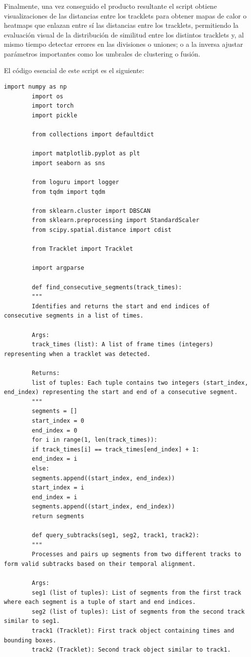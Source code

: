 \documentclass[12pt, a4paper, twoside]{article}
\begin{document}
	Finalmente, una vez conseguido el producto resultante el script obtiene visualizaciones de las distancias entre los tracklets para obtener mapas de calor o heatmaps que enlazan entre sí las distancias entre los tracklets, permitiendo la evaluación visual de la distribución de similitud entre los distintos tracklets y, al mismo tiempo detectar errores en las divisiones o uniones; o a la inversa ajustar parámetros importantes como los umbrales de clustering o fusión.
	
	
	El código esencial de este script es el siguiente:
	\vspace{0.5cm}
	
	\begin{lstlisting}[style=pythonstyle]
		import numpy as np
		import os
		import torch
		import pickle
		
		from collections import defaultdict
		
		import matplotlib.pyplot as plt
		import seaborn as sns
		
		from loguru import logger
		from tqdm import tqdm
		
		from sklearn.cluster import DBSCAN
		from sklearn.preprocessing import StandardScaler
		from scipy.spatial.distance import cdist
		
		from Tracklet import Tracklet
		
		import argparse
		
		def find_consecutive_segments(track_times):
		"""
		Identifies and returns the start and end indices of consecutive segments in a list of times.
		
		Args:
		track_times (list): A list of frame times (integers) representing when a tracklet was detected.
		
		Returns:
		list of tuples: Each tuple contains two integers (start_index, end_index) representing the start and end of a consecutive segment.
		"""
		segments = []
		start_index = 0
		end_index = 0
		for i in range(1, len(track_times)):
		if track_times[i] == track_times[end_index] + 1:
		end_index = i
		else:
		segments.append((start_index, end_index))
		start_index = i
		end_index = i
		segments.append((start_index, end_index))
		return segments
		
		def query_subtracks(seg1, seg2, track1, track2):
		"""
		Processes and pairs up segments from two different tracks to form valid subtracks based on their temporal alignment.
		
		Args:
		seg1 (list of tuples): List of segments from the first track where each segment is a tuple of start and end indices.
		seg2 (list of tuples): List of segments from the second track similar to seg1.
		track1 (Tracklet): First track object containing times and bounding boxes.
		track2 (Tracklet): Second track object similar to track1.
		

\end{lstlisting}
\end{document}
